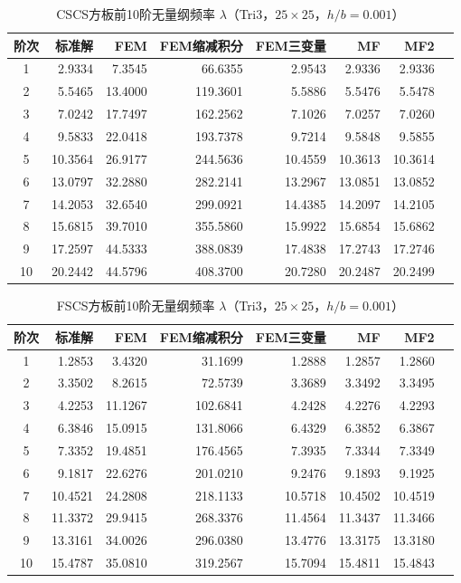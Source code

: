 \begin{table}[H]
\centering
\caption{CSCS方板前10阶无量纲频率 $\lambda$（Tri3，$25\times25$，$h/b=0.001$）}
\label{tab:vib_cscs}
\begin{tabular}{crrrrrrr}
\hline
阶次 & 标准解\cite{liew1993} & FEM & FEM缩减积分 & FEM三变量 & MF & MF2 \\
\hline
1 & 2.9334 & 7.3545 & 66.6355 & 2.9543 & 2.9336 & 2.9336 \\
2 & 5.5465 & 13.4000 & 119.3601 & 5.5886 & 5.5476 & 5.5478 \\
3 & 7.0242 & 17.7497 & 162.2562 & 7.1026 & 7.0257 & 7.0260 \\
4 & 9.5833 & 22.0418 & 193.7378 & 9.7214 & 9.5848 & 9.5855 \\
5 & 10.3564 & 26.9177 & 244.5636 & 10.4559 & 10.3613 & 10.3614 \\
6 & 13.0797 & 32.2880 & 282.2141 & 13.2967 & 13.0851 & 13.0852 \\
7 & 14.2053 & 32.6540 & 299.0921 & 14.4385 & 14.2097 & 14.2105 \\
8 & 15.6815 & 39.7010 & 355.5860 & 15.9922 & 15.6854 & 15.6862 \\
9 & 17.2597 & 44.5333 & 388.0839 & 17.4838 & 17.2743 & 17.2746 \\
10 & 20.2442 & 44.5796 & 408.3700 & 20.7280 & 20.2487 & 20.2499 \\
\hline
\end{tabular}
\end{table}

\begin{table}[H]
\centering
\caption{FSCS方板前10阶无量纲频率 $\lambda$（Tri3，$25\times25$，$h/b=0.001$）}
\label{tab:vib_fscs}
\begin{tabular}{crrrrrrr}
\hline
阶次 & 标准解\cite{liew1993} & FEM & FEM缩减积分 & FEM三变量 & MF & MF2 \\
\hline
1 & 1.2853 & 3.4320 & 31.1699 & 1.2888 & 1.2857 & 1.2860 \\
2 & 3.3502 & 8.2615 & 72.5739 & 3.3689 & 3.3492 & 3.3495 \\
3 & 4.2253 & 11.1267 & 102.6841 & 4.2428 & 4.2276 & 4.2293 \\
4 & 6.3846 & 15.0915 & 131.8066 & 6.4329 & 6.3852 & 6.3867 \\
5 & 7.3352 & 19.4851 & 176.4565 & 7.3935 & 7.3344 & 7.3349 \\
6 & 9.1817 & 22.6276 & 201.0210 & 9.2476 & 9.1893 & 9.1925 \\
7 & 10.4521 & 24.2808 & 218.1133 & 10.5718 & 10.4502 & 10.4519 \\
8 & 11.3372 & 29.9415 & 268.3376 & 11.4564 & 11.3437 & 11.3466 \\
9 & 13.3161 & 34.0026 & 296.0380 & 13.4776 & 13.3175 & 13.3180 \\
10 & 15.4787 & 35.0810 & 319.2567 & 15.7094 & 15.4811 & 15.4843 \\
\hline
\end{tabular}
\end{table}

